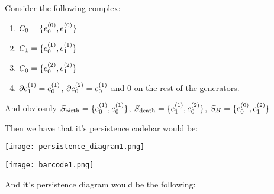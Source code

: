 \begin{example}


%
%
%
%
%


Consider the following complex:

\begin{enumerate}

\item $C_0 = \{e_{0}^{(0)},e_{1}^{(0)}\}$

\item $C_1 = \{e_{0}^{(1)},e_{1}^{(1)}\}$

\item $C_0 = \{e_{0}^{(2)},e_{1}^{(2)}\}$

\item $\partial e_{1}^{(1)}=e_{0}^{(1)}$, $\partial e_{0}^{(2)}=e_{0}^{(1)}$ and 
$0$ on the rest of the generators.
\end{enumerate}

And obviosuly $S_{\text{birth}}=\{
e_{0}^{(1)},
e_{0}^{(1)}
\}$,
$S_{\text{death}}=\{
e_{1}^{(1)},
e_{0}^{(2)}
\}$,
$
S_H=\{
e_{0}^{(0)},
e_{1}^{(2)}
\}
$

Then we have that it's persistence codebar would be:

\begin{center}
\texttt{[image: persistence\_diagram1.png]}
\end{center}




\begin{center}
\texttt{[image: barcode1.png]}
\end{center}

And it's persistence diagram would be the following:

\end{example}







